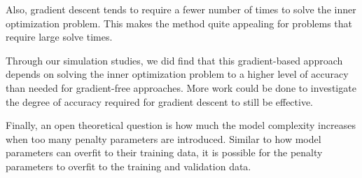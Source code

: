 \documentclass[12pt]{article}
\begin{document}
Also, gradient descent tends to require a fewer number of times to solve the inner optimization problem. This makes the method quite appealing for problems that require large solve times. 

Through our simulation studies, we did find that this gradient-based approach depends on solving the inner optimization problem to a higher level of accuracy than needed for gradient-free approaches. More work could be done to investigate the degree of accuracy required for gradient descent to still be effective.

Finally, an open theoretical question is how much the model complexity increases when too many penalty parameters are introduced. Similar to how model parameters can overfit to their training data, it is possible for the penalty parameters to overfit to the training and validation data.

\bigskip



\end{document}
